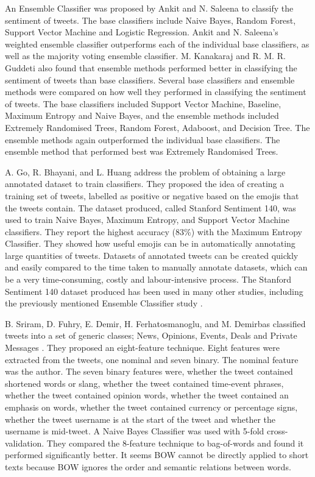 An Ensemble Classifier was proposed by Ankit and N. Saleena \cite{Ankit2018} to classify the sentiment of tweets. The base classifiers include Naive Bayes, Random Forest, Support Vector Machine and Logistic Regression. Ankit and N. Saleena's weighted ensemble classifier outperforms each of the individual base classifiers, as well as the majority voting ensemble classifier. M. Kanakaraj and R. M. R. Guddeti \cite{Kanakaraj2015} also found that ensemble methods performed better in classifying the sentiment of tweets than base classifiers. Several base classifiers and ensemble methods were compared on how well they performed in classifying the sentiment of tweets. The base classifiers included Support Vector Machine, Baseline, Maximum Entropy and Naive Bayes, and the ensemble methods included Extremely Randomised Trees, Random Forest, Adaboost, and Decision Tree. The ensemble methods again outperformed the individual base classifiers. The ensemble method that performed best was Extremely Randomised Trees.

A. Go, R. Bhayani, and L. Huang \cite{Go2009} address the problem of obtaining a large annotated dataset to train classifiers. They proposed the idea of creating a training set of tweets, labelled as positive or negative based on the emojis that the tweets contain. The dataset produced, called Stanford Sentiment 140, was used to train Naive Bayes, Maximum Entropy, and Support Vector Machine classifiers. They report the highest accuracy (83\%) with the Maximum Entropy Classifier. They showed how useful emojis can be in automatically annotating large quantities of tweets. Datasets of annotated tweets can be created quickly and easily compared to the time taken to manually annotate datasets, which can be a very time-consuming, costly and labour-intensive process. The Stanford Sentiment 140 dataset produced has been used in many other studies, including the previously mentioned Ensemble Classifier study \cite{Ankit2018}.

B. Sriram, D. Fuhry, E. Demir, H. Ferhatosmanoglu, and M. Demirbas classified tweets into a set of generic classes; News, Opinions, Events, Deals and Private Messages \cite{sriram2010}. They proposed an eight-feature technique. Eight features were extracted from the tweets, one nominal and seven binary. The nominal feature was the author. The seven binary features were, whether the tweet contained shortened words or slang, whether the tweet contained time-event phrases, whether the tweet contained opinion words, whether the tweet contained an emphasis on words, whether the tweet contained currency or percentage signs, whether the tweet username is at the start of the tweet and whether the username is mid-tweet. A Naive Bayes Classifier was used with 5-fold cross-validation. They compared the 8-feature technique to bag-of-words and found it performed significantly better. It seems BOW cannot be directly applied to short texts because BOW ignores the order and semantic relations between words.


